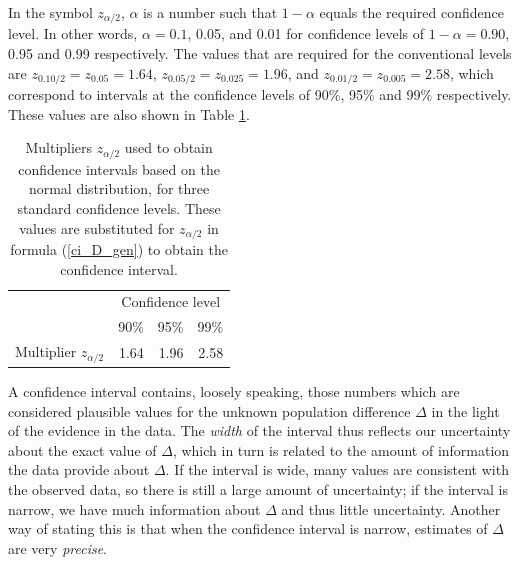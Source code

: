 In the symbol $z_{\alpha/2}$, $\alpha$ is a number such that $1-\alpha$
equals the required confidence level. In other words, $\alpha=0.1$,
0.05, and 0.01 for confidence levels of $1-\alpha=0.90$, 0.95 and 0.99
respectively. The values that are required for the conventional levels
are $z_{0.10/2}=z_{0.05}=1.64$, $z_{0.05/2}=z_{0.025}=1.96$, and
$z_{0.01/2}=z_{0.005}=2.58$, which correspond to intervals at the
confidence levels of 90\%, 95\% and 99\% respectively. These values are
also shown in Table \ref{t_ciq}.

\begin{table}
\caption{Multipliers $z_{\alpha/2}$ used to obtain confidence intervals
based on the normal distribution, for three standard confidence
levels. These values are substituted for $z_{\alpha/2}$ in formula
(\ref{ci_D_gen}) to obtain the confidence interval.}
\label{t_ciq}
\begin{center}
\begin{tabular}{|l|rrr|}\hline
& \multicolumn{3}{|c|}{Confidence level} \\
& 90\% & 95\% & 99\% \\ \hline
Multiplier $z_{\alpha/2}$ & 1.64 & 1.96 & 2.58 \\
\hline
\end{tabular}
\end{center}
\end{table}

A confidence interval contains, loosely speaking, those numbers which
are considered plausible values for the unknown population difference
$\Delta$ in
the light of the evidence in the data. The \emph{width} of the interval
thus reflects our uncertainty about the exact value of $\Delta$, which
in turn is related to the amount of information the data provide about
$\Delta$. If the interval is wide, many values are consistent with the
observed data, so there is still a large amount of uncertainty; if the
interval is narrow, we have much information about $\Delta$ and thus little
uncertainty. Another way of stating this is that when the confidence
interval is narrow, estimates of $\Delta$ are very \emph{precise}.

